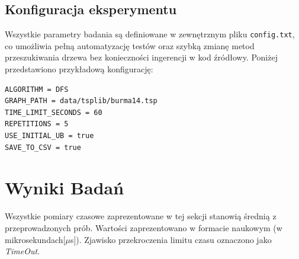 \documentclass[conference]{IEEEtran}
\begin{document}
        \subsection{Konfiguracja eksperymentu}
            Wszystkie parametry badania są definiowane w zewnętrznym pliku \texttt{config.txt}, co umożliwia pełną automatyzację testów oraz szybką zmianę metod przeszukiwania drzewa bez konieczności ingerencji w kod źródłowy. Poniżej przedstawiono przykładową konfigurację:
\begin{verbatim}
ALGORITHM = DFS
GRAPH_PATH = data/tsplib/burma14.tsp
TIME_LIMIT_SECONDS = 60
REPETITIONS = 5
USE_INITIAL_UB = true
SAVE_TO_CSV = true
\end{verbatim}


    \section{Wyniki Badań}
        Wszystkie pomiary czasowe zaprezentowane w tej sekcji stanowią średnią z przeprowadzonych prób. Wartości zaprezentowano w formacie naukowym (w mikrosekundach[$\mu$s]). Zjawisko przekroczenia limitu czasu oznaczono jako \textit{TimeOut}.
\end{document}
